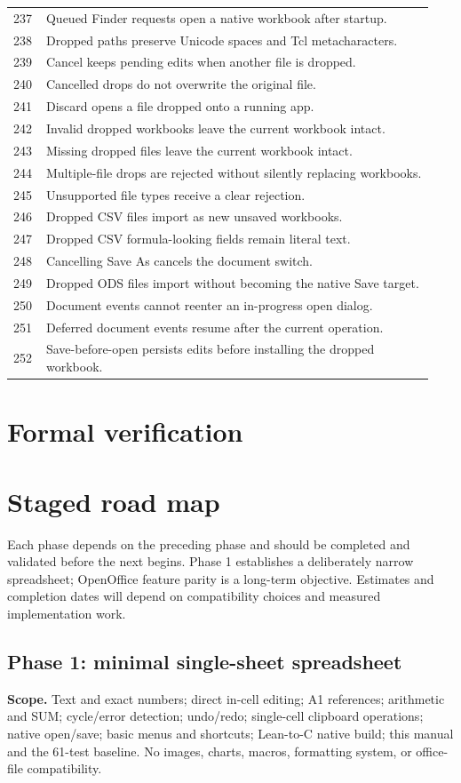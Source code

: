 \documentclass[11pt,letterpaper]{article}
\begin{document}
\begin{longtable}{@{}P{0.07\linewidth}P{0.87\linewidth}@{}}
237 & Queued Finder requests open a native workbook after startup.\\
238 & Dropped paths preserve Unicode spaces and Tcl metacharacters.\\
239 & Cancel keeps pending edits when another file is dropped.\\
240 & Cancelled drops do not overwrite the original file.\\
241 & Discard opens a file dropped onto a running app.\\
242 & Invalid dropped workbooks leave the current workbook intact.\\
243 & Missing dropped files leave the current workbook intact.\\
244 & Multiple-file drops are rejected without silently replacing workbooks.\\
245 & Unsupported file types receive a clear rejection.\\
246 & Dropped CSV files import as new unsaved workbooks.\\
247 & Dropped CSV formula-looking fields remain literal text.\\
248 & Cancelling Save As cancels the document switch.\\
249 & Dropped ODS files import without becoming the native Save target.\\
250 & Document events cannot reenter an in-progress open dialog.\\
251 & Deferred document events resume after the current operation.\\
252 & Save-before-open persists edits before installing the dropped workbook.\\
\bottomrule\end{longtable}

\clearpage
\section{Formal verification}
\clearpage
\section{Staged road map}
Each phase depends on the preceding phase and should be completed and validated
before the next begins. Phase 1 establishes a deliberately narrow spreadsheet;
OpenOffice feature parity is a long-term objective. Estimates and completion dates
will depend on compatibility choices and measured implementation work.

\subsection*{Phase 1: minimal single-sheet spreadsheet}
\textbf{Scope.} Text and exact numbers; direct in-cell editing; A1 references; arithmetic and
SUM; cycle/error detection; undo/redo; single-cell clipboard operations; native
open/save; basic menus and shortcuts; Lean-to-C native build; this manual and the
61-test baseline. No images, charts, macros, formatting system, or office-file
compatibility.
\end{document}
